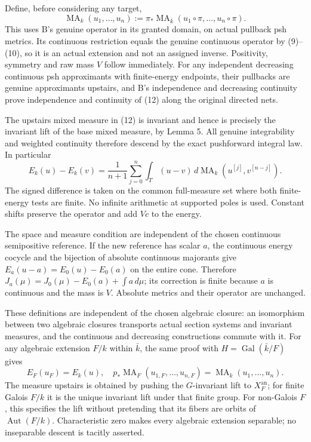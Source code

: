 \documentclass[
  11pt,
]{article}
\begin{document}
Define, before considering any target, \[
 \operatorname{MA}_k(u_1,\ldots,u_n)
 :=\pi_*\operatorname{MA}_{\bar k}(u_1\circ\pi,\ldots,u_n\circ\pi).
 \tag{12}
\] This uses B's genuine operator in its granted domain, on actual
pullback psh metrics. Its continuous restriction equals the genuine
continuous operator by (9)--(10), so it is an actual extension and not
an assigned inverse. Positivity, symmetry and raw mass \(V\) follow
immediately. For any independent decreasing continuous psh approximants
with finite-energy endpoints, their pullbacks are genuine approximants
upstairs, and B's independence and decreasing continuity prove
independence and continuity of (12) along the original directed nets.

The upstairs mixed measure in (12) is invariant and hence is precisely
the invariant lift of the base mixed measure, by Lemma 5. All genuine
integrability and weighted continuity therefore descend by the exact
pushforward integral law. In particular \[
 E_k(u)-E_k(v)=\frac1{n+1}\sum_{j=0}^n
    \int_T(u-v)\,d\operatorname{MA}_k(u^{[j]},v^{[n-j]}).
 \tag{13}
\] The signed difference is taken on the common full-measure set where
both finite-energy tests are finite. No infinite arithmetic at supported
poles is used. Constant shifts preserve the operator and add \(Vc\) to
the energy.

The space and measure condition are independent of the chosen continuous
semipositive reference. If the new reference has scalar \(a\), the
continuous energy cocycle and the bijection of absolute continuous
majorants give \(E_a(u-a)=E_0(u)-E_0(a)\) on the entire cone. Therefore
\(J_a(\mu)=J_0(\mu)-E_0(a)+\int a\,d\mu\); its correction is finite
because \(a\) is continuous and the mass is \(V\). Absolute metrics and
their operator are unchanged.

These definitions are independent of the chosen algebraic closure: an
isomorphism between two algebraic closures transports actual section
systems and invariant measures, and the continuous and decreasing
constructions commute with it. For any algebraic extension \(F/k\)
within \(\bar k\), the same proof with
\(H=\operatorname{Gal}(\bar k/F)\) gives \[
 E_F(u_F)=E_k(u),\quad
 p_*\operatorname{MA}_F(u_{1,F},\ldots,u_{n,F})
       =\operatorname{MA}_k(u_1,\ldots,u_n).
 \tag{14}
\] The measure upstairs is obtained by pushing the \(G\)-invariant lift
to \(X_F^{\mathrm{an}}\); for finite Galois \(F/k\) it is the unique
invariant lift under that finite group. For non-Galois \(F\), this
specifies the lift without pretending that its fibers are orbits of
\(\operatorname{Aut}(F/k)\). Characteristic zero makes every algebraic
extension separable; no inseparable descent is tacitly asserted.
\end{document}
